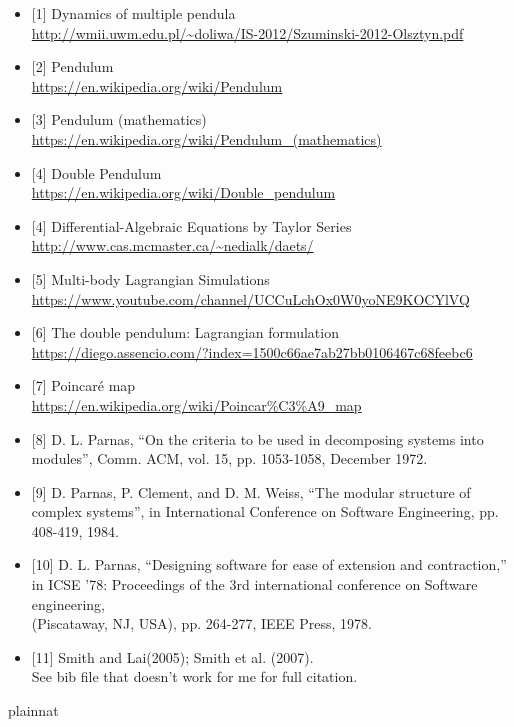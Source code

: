 \documentclass[12pt, titlepage]{article}
\begin{document}
\begin{itemize}
\item{[1]} Dynamics of multiple pendula 
\\\url{http://wmii.uwm.edu.pl/~doliwa/IS-2012/Szuminski-2012-Olsztyn.pdf}
\item{[2]} Pendulum \\\url{https://en.wikipedia.org/wiki/Pendulum}
\item{[3]} Pendulum (mathematics)
\\\url{https://en.wikipedia.org/wiki/Pendulum_(mathematics)}
\item{[4]} Double Pendulum
\\\url{https://en.wikipedia.org/wiki/Double_pendulum}\item{[4]}
Differential-Algebraic Equations by Taylor Series
\\\url{http://www.cas.mcmaster.ca/~nedialk/daets/}
\item{[5]} Multi-body Lagrangian Simulations
\\\url{https://www.youtube.com/channel/UCCuLchOx0W0yoNE9KOCYlVQ}
\item{[6]} The double pendulum: Lagrangian formulation
\\\url{https://diego.assencio.com/?index=1500c66ae7ab27bb0106467c68feebc6}
\item{[7]} Poincaré map
\\\url{https://en.wikipedia.org/wiki/Poincar%C3%A9_map}
\item{[8]} D. L. Parnas, ``On the criteria to be used in decomposing systems 
into modules'', Comm. ACM, vol. 15, pp. 1053-1058, December 1972.
\item{[9]} D. Parnas, P. Clement, and D. M. Weiss, ``The modular structure 
of complex systems'', in International Conference on Software Engineering, 
pp. 408-419, 1984.
\item{[10]} D. L. Parnas, ``Designing software for ease of extension and 
contraction,'' in ICSE '78: Proceedings of the 3rd international conference 
on Software engineering, \\
(Piscataway, NJ, USA), pp. 264-277, IEEE Press, 1978.
\item{[11]} Smith and Lai(2005); Smith et al. (2007). \\
See bib file that doesn't work for me for full citation.
\end{itemize}

 {plainnat}

\end{document}
